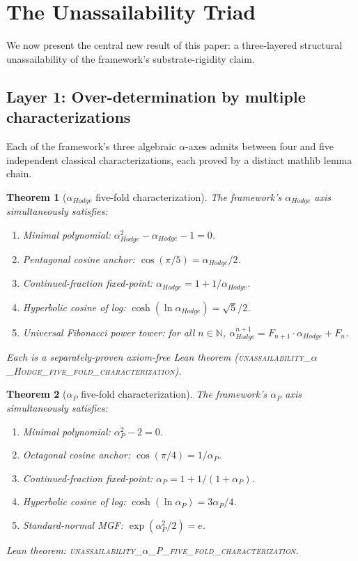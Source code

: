 \documentclass[11pt,a4paper]{amsart}
\theoremstyle{plain}
\newtheorem{theorem}{Theorem}[section]
\theoremstyle{definition}
\newcommand{\Nn}{\mathbb{N}}
\newcommand{\aP}{\alpha_{P}}
\newcommand{\aHodge}{\alpha_{Hodge}}
\begin{document}
\section{The Unassailability Triad}
\label{sec:triad}

We now present the central new result of this paper: a three-layered
structural unassailability of the framework's substrate-rigidity claim.

\subsection{Layer 1: Over-determination by multiple characterizations}
\label{sec:overdet}

Each of the framework's three algebraic $\alpha$-axes admits between
four and five independent classical characterizations, each proved by
a distinct mathlib lemma chain.

\begin{theorem}[$\aHodge$ five-fold characterization]
\label{thm:hodge5fold}
The framework's $\aHodge$ axis simultaneously satisfies:
\begin{enumerate}[label=(\arabic*)]
\item Minimal polynomial: $\aHodge^{2} - \aHodge - 1 = 0$.
\item Pentagonal cosine anchor: $\cos(\pi/5) = \aHodge/2$.
\item Continued-fraction fixed-point: $\aHodge = 1 + 1/\aHodge$.
\item Hyperbolic cosine of log: $\cosh(\ln \aHodge) = \sqrt{5}/2$.
\item Universal Fibonacci power tower: for all $n \in \Nn$,
$\aHodge^{n+1} = F_{n+1} \cdot \aHodge + F_{n}$.
\end{enumerate}
Each is a separately-proven axiom-free Lean theorem
(\textsc{unassailability\_$\alpha$\_Hodge\_five\_fold\_characterization}).
\end{theorem}

\begin{theorem}[$\aP$ five-fold characterization]
\label{thm:p5fold}
The framework's $\aP$ axis simultaneously satisfies:
\begin{enumerate}[label=(\arabic*)]
\item Minimal polynomial: $\aP^{2} - 2 = 0$.
\item Octagonal cosine anchor: $\cos(\pi/4) = 1/\aP$.
\item Continued-fraction fixed-point: $\aP = 1 + 1/(1 + \aP)$.
\item Hyperbolic cosine of log: $\cosh(\ln \aP) = 3 \aP / 4$.
\item Standard-normal MGF: $\exp(\aP^{2}/2) = e$.
\end{enumerate}
Lean theorem:
\textsc{unassailability\_$\alpha$\_P\_five\_fold\_characterization}.
\end{theorem}
\end{document}
